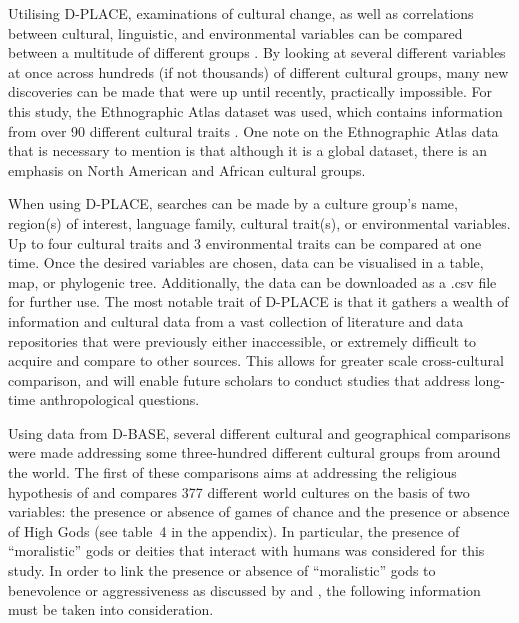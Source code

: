 \documentclass[%
	]{ijsra}
\begin{document}
 Utilising D-PLACE, examinations of cultural change, as well as correlations between cultural, linguistic, and environmental variables can be compared between a multitude of different groups \parencite{kirby2016}. By looking at several different variables at once across hundreds (if not thousands) of different cultural groups, many new discoveries can be made that were up until recently, practically impossible. For this study, the Ethnographic Atlas dataset was used, which contains information from over 90 different cultural traits \parencite{kirby2016}. One note on the Ethnographic Atlas data that is necessary to mention is that although it is a global dataset, there is an emphasis on North American and African cultural groups.
 
 When using D-PLACE, searches can be made by a culture group’s name, region(s) of interest, language family, cultural trait(s), or environmental variables. Up to four cultural traits and 3 environmental traits can be compared at one time. Once the desired variables are chosen, data can be visualised in a table, map, or phylogenic tree. Additionally, the data can be downloaded as a .csv file for further use. The most notable trait of D-PLACE is that it gathers a wealth of information and cultural data from a vast collection of literature and data repositories \parencite{kirby2016} that were previously either inaccessible, or extremely difficult to acquire and compare to other sources. This allows for greater scale cross-cultural comparison, and will enable future scholars to conduct studies that address long-time anthropological questions.

Using data from D-BASE, several different cultural and geographical comparisons were made addressing some three-hundred different cultural groups from around the world. The first of these comparisons aims at addressing the religious hypothesis of \textcite{roberts1959} and compares 377 different world cultures on the basis of two variables: the presence or absence of games of chance and the presence or absence of High Gods (see table~4 in the appendix).
 In particular, the presence of ``moralistic” gods or deities that interact with humans was considered for this study. In order to link the presence or absence of ``moralistic” gods to benevolence or aggressiveness as discussed by \textcite{lambert1959} and \textcite{roberts1959}, the following information must be taken into consideration. 
\end{document}
